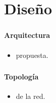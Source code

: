 \section{Diseño}

\begin{frame}
\frametitle{\secname} %
\framesubtitle{Arquitectura} %
\rmfamily %
\color{black} %
\begin{itemize}
    \item {} propuesta.
\begin{figure}
    \centering
    \resizebox{0.8\textwidth}{!}{
        
    }
\end{figure}
\end{itemize}
\end{frame}

\begin{frame}
\frametitle{\secname} %
\framesubtitle{Topología} %
\rmfamily %
\color{black} %
\begin{itemize}
    \item {} de la red.
\begin{figure}
    \centering
    \resizebox{0.8\textwidth}{!}{
        
    }
\end{figure}
\end{itemize}
\end{frame}

